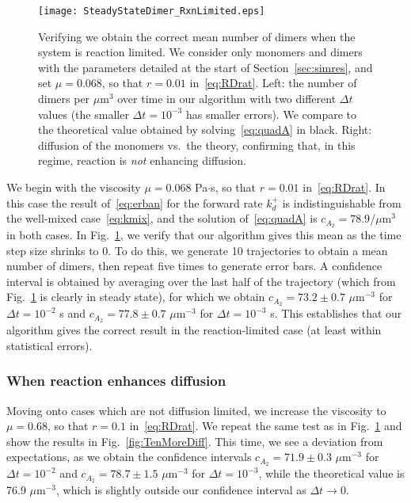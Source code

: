 \documentclass[11pt]{article}
\newcommand{\C}[1]{c_{#1}}
\begin{document}
\begin{figure}
\centering
\texttt{[image: SteadyStateDimer\_RxnLimited.eps]}
\caption{\label{fig:RxnLimited}Verifying we obtain the correct mean number of dimers when the system is reaction limited. We consider only monomers and dimers with the parameters detailed at the start of Section\ \ref{sec:simres}, and set $\mu=0.068$, so that $r=0.01$ in\ \eqref{eq:RDrat}. Left: the number of dimers per $\mu$m$^3$ over time in our algorithm with two different $\Delta t$ values (the smaller $\Delta t = 10^{-3}$ has smaller errors). We compare to the theoretical value obtained by solving\ \eqref{eq:quadA} in black. Right: diffusion of the monomers vs.\ the theory, confirming that, in this regime, reaction is \emph{not} enhancing diffusion.}
\end{figure}


We begin with the viscosity $\mu=0.068$ Pa$\cdot$s, so that $r=0.01$ in\ \eqref{eq:RDrat}. In this case the result of\ \eqref{eq:erban} for the forward rate $k_d^+$ is indistinguishable from the well-mixed case\ \eqref{eq:kmix}, and the solution of\ \eqref{eq:quadA} is $\C{A_2}=78.9$/$\mu$m$^3$ in both cases. In Fig.\ \ref{fig:RxnLimited}, we verify that our algorithm gives this mean as the time step size shrinks to 0. To do this, we generate 10 trajectories to obtain a mean number of dimers, then repeat five times to generate error bars. A confidence interval is obtained by averaging over the last half of the trajectory (which from Fig.\ \ref{fig:RxnLimited} is clearly in steady state), for which we obtain $\C{A_2}=73.2 \pm 0.7$ $\mu$m$^{-3}$ for $\Delta t =10^{-2}$ s and $\C{A_2}=77.8 \pm 0.7$ $\mu$m$^{-3}$ for $\Delta t =10^{-3}$ s. This establishes that our algorithm gives the correct result in the reaction-limited case (at least within statistical errors). 

\subsubsection{When reaction enhances diffusion}
Moving onto cases which are not diffusion limited, we increase the viscosity to $\mu=0.68$, so that $r=0.1$ in\ \eqref{eq:RDrat}. We repeat the same test as in Fig.\ \ref{fig:RxnLimited} and show the results in Fig.\ \ref{fig:TenMoreDiff}. This time, we see a deviation from expectations, as we obtain the confidence intervals $\C{A_2}=71.9 \pm 0.3$ $\mu$m$^{-3}$ for $\Delta t =10^{-2}$ and $\C{A_2}=78.7 \pm 1.5$ $\mu$m$^{-3}$ for $\Delta t =10^{-3}$, while the theoretical value is 76.9 $\mu$m$^{-3}$, which is slightly outside our confidence interval as $\Delta t \rightarrow 0$. 
\end{document}
